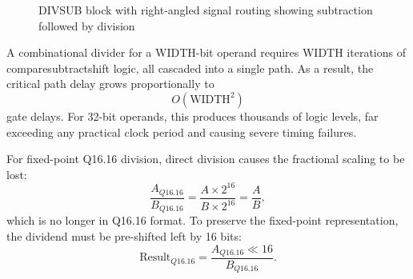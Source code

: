 \documentclass[a4paper,12pt]{article}
\begin{document}
\begin{figure}[H]
\centering
{}
\caption{DIVSUB block with right-angled signal routing showing subtraction followed by division}
\end{figure}

A combinational divider for a WIDTH-bit operand requires WIDTH iterations of compare\-subtract\-shift logic, all cascaded into a single path. As a result, the critical path delay grows proportionally to
\begin{equation}
O(\text{WIDTH}^2)
\end{equation}
gate delays. For 32-bit operands, this produces thousands of logic levels, far exceeding any practical clock period and causing severe timing failures.

For fixed-point Q16.16 division, direct division causes the fractional scaling to be lost:
\begin{equation}
\frac{A_{Q16.16}}{B_{Q16.16}} = \frac{A \times 2^{16}}{B \times 2^{16}} = \frac{A}{B},
\end{equation}
which is no longer in Q16.16 format. To preserve the fixed-point representation, the dividend must be pre-shifted left by 16 bits:
\begin{equation}
\text{Result}_{Q16.16} = \frac{A_{Q16.16} \ll 16}{B_{Q16.16}}.
\end{equation}
\end{document}

